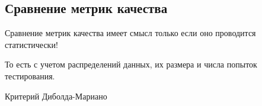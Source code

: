 \begin{enumerate}
\end{enumerate}

\subsection{Сравнение метрик качества}

Сравнение метрик качества имеет смысл только если оно проводится статистически!

То есть с учетом распределений данных, их размера и числа попыток тестирования.

Критерий Диболда-Мариано